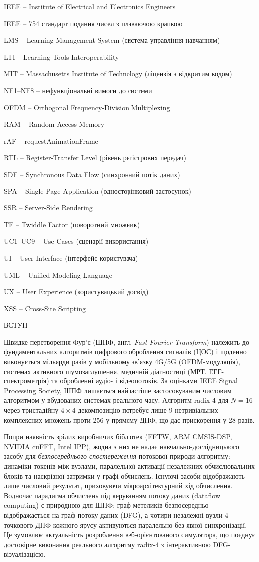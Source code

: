 \documentclass[
]{article}
\begin{document}
IEEE -- Institute of Electrical and Electronics Engineers

IEEE -- 754 стандарт подання чисел з плаваючою крапкою

LMS -- Learning Management System (система управління навчанням)

LTI -- Learning Tools Interoperability

MIT -- Massachusetts Institute of Technology (ліцензія з відкритим
кодом)

NF1--NF8 -- нефункціональні вимоги до системи

OFDM -- Orthogonal Frequency-Division Multiplexing

RAM -- Random Access Memory

rAF -- requestAnimationFrame

RTL -- Register-Transfer Level (рівень регістрових передач)

SDF -- Synchronous Data Flow (синхронний потік даних)

SPA -- Single Page Application (односторінковий застосунок)

SSR -- Server-Side Rendering

TF -- Twiddle Factor (поворотний множник)

UC1--UC9 -- Use Cases (сценарії використання)

UI -- User Interface (інтерфейс користувача)

UML -- Unified Modeling Language

UX -- User Experience (користувацький досвід)

XSS -- Cross-Site Scripting

\protect{}\label{_Toc230737377}{}ВСТУП

Швидке перетворення Фур'є (ШПФ, англ. \emph{Fast Fourier Transform})
належить до фундаментальних алгоритмів цифрового оброблення сигналів
(ЦОС) і щоденно виконується мільярди разів у мобільному зв'язку 4G/5G
(OFDM-модуляція), системах активного шумозаглушення, медичній
діагностиці (МРТ, ЕЕГ-спектрометрія) та обробленні аудіо- і
відеопотоків. За оцінками IEEE Signal Processing Society, ШПФ лишається
найчастіше застосовуваним числовим алгоритмом у вбудованих системах
реального часу. Алгоритм radix-4 для \(N = 16\) через тристадійну
\(4 \times 4\) декомпозицію потребує лише 9 нетривіальних комплексних
множень проти 256 у прямому ДПФ, що дає прискорення у 28 разів.

Попри наявність зрілих виробничих бібліотек (FFTW, ARM CMSIS-DSP, NVIDIA
cuFFT, Intel IPP), жодна з них не надає навчально-дослідницького засобу
для \emph{безпосереднього спостереження} потокової природи алгоритму:
динаміки токенів між вузлами, паралельної активації незалежних
обчислювальних блоків та наскрізної затримки у графі обчислень. Існуючі
засоби відображають лише числовий результат, приховуючи
мікроархітектурний хід обчислення. Водночас парадигма обчислень під
керуванням потоку даних (dataflow computing) є природною для ШПФ: граф
метеликів безпосередньо відображається на граф потоку даних (DFG), а
чотири незалежні вузли 4-точкового ДПФ кожного ярусу активуються
паралельно без явної синхронізації. Це зумовлює актуальність розроблення
веб-орієнтованого симулятора, що поєднує достовірне виконання реального
алгоритму radix-4 з інтерактивною DFG-візуалізацією.
\end{document}
